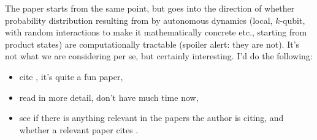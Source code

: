 \documentclass[ a4paper, 
                amsfonts, 
                amssymb, 
                amsmath, 
                reprint, 
                showkeys, 
                nofootinbib,
                superscriptaddress, 
                onecolumn, 
                notitlepage,
                aps,
                pra,
                longbibliography]{revtex4-1}
\theoremstyle{definition}
\begin{document}
The paper \cite{QuantumAdvantage} starts from the same point, but goes into the direction of whether probability distribution resulting from by autonomous dynamics (local, $k$-qubit, with random interactions to make it mathematically concrete etc., starting from product states) are computationally tractable (spoiler alert: they are not). It's not what we are considering per se, but certainly interesting. I'd do the following:
\begin{itemize}
    \item cite \cite{QuantumAdvantage}, it's quite a fun paper,
    \item read in more detail, don't have much time now,
    \item see if there is anything relevant in the papers the author is citing, and whether a relevant paper cites \cite{QuantumAdvantage}.
\end{itemize}



\end{document}
